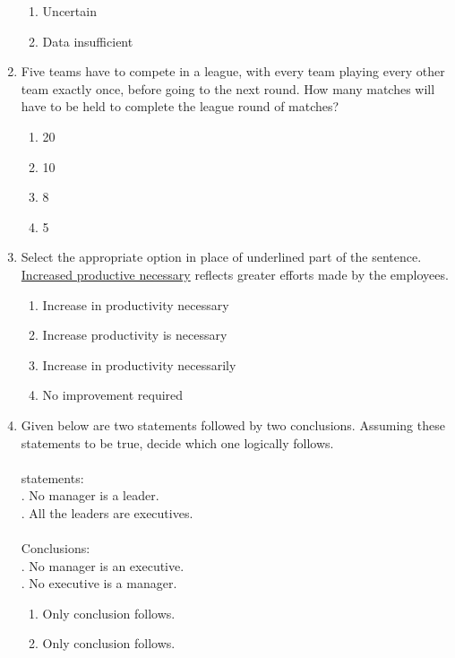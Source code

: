 \documentclass[journal,12pt,onecolumn]{IEEEtran}
\theoremstyle{remark}
\begin{document}
\begin{enumerate}
\begin{enumerate}
        \item Uncertain
        \item Data insufficient
    \end{enumerate}
    \item Five teams have to compete in a league, with every team playing every other team exactly once, before going to the next round. How many matches will have to be held to complete the league round of matches?
    \begin{enumerate}
        \item 20
        \item 10
        \item 8
        \item 5
    \end{enumerate}
    \item Select the appropriate option in place of underlined part of the sentence.\\ \underline{Increased productive necessary} reflects greater efforts made by the employees.
    \begin{enumerate}
        \item Increase in productivity necessary
        \item Increase productivity is necessary
        \item Increase in productivity necessarily
        \item No improvement required
    \end{enumerate}
    \item Given below are two statements followed by two conclusions. Assuming these statements to be true, decide which one logically follows.\\\\
    statements:\\
    \uppercase{\expandafter{}}. No manager is a leader.\\
    \uppercase{\expandafter{}}. All the leaders are executives.\\\\
    Conclusions:\\
    \uppercase{\expandafter{}}. No manager is an executive.\\
    \uppercase{\expandafter{}}. No executive is a manager.
    \begin{enumerate}
        \item Only conclusion \uppercase{\expandafter{}} follows.
        \item Only conclusion \uppercase{\expandafter{}} follows.

\end{enumerate}
\end{enumerate}
\end{document}
